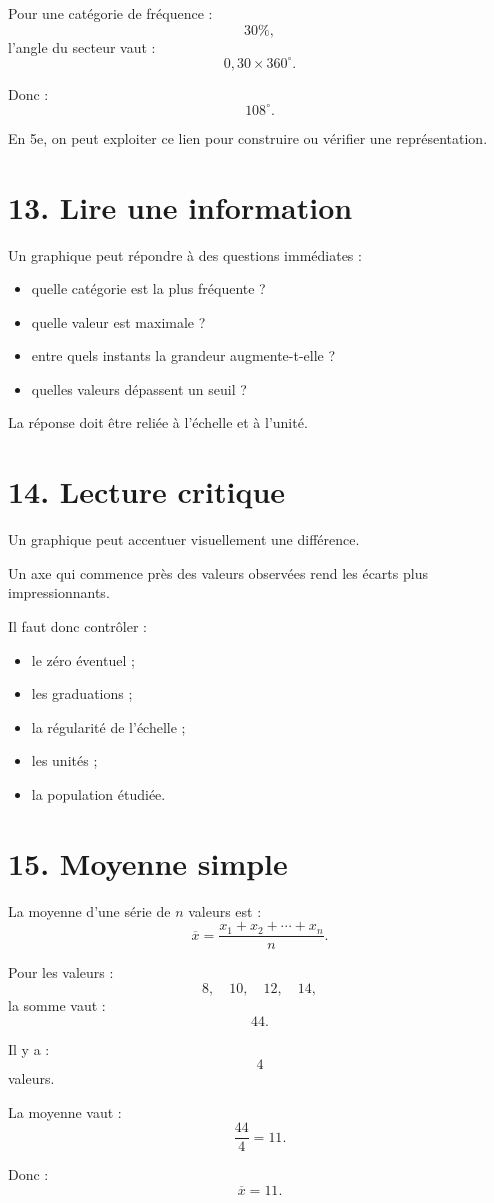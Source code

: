Pour une catégorie de fréquence :
\[
30\%,
\]
l'angle du secteur vaut :
\[
0{,}30\times360^\circ.
\]

Donc :
\[
108^\circ.
\]

En 5e, on peut exploiter ce lien pour construire ou vérifier une représentation.

\section{13. Lire une information}

Un graphique peut répondre à des questions immédiates :
\begin{itemize}
\item quelle catégorie est la plus fréquente ?
\item quelle valeur est maximale ?
\item entre quels instants la grandeur augmente-t-elle ?
\item quelles valeurs dépassent un seuil ?
\end{itemize}

La réponse doit être reliée à l'échelle et à l'unité.

\section{14. Lecture critique}

Un graphique peut accentuer visuellement une différence.

Un axe qui commence près des valeurs observées rend les écarts plus impressionnants.

Il faut donc contrôler :
\begin{itemize}
\item le zéro éventuel ;
\item les graduations ;
\item la régularité de l'échelle ;
\item les unités ;
\item la population étudiée.
\end{itemize}

\section{15. Moyenne simple}

La moyenne d'une série de $n$ valeurs est :
\[
\boxed{
\overline{x}
=
\dfrac{x_1+x_2+\cdots+x_n}{n}
}.
\]

\begin{exemple}
Pour les valeurs :
\[
8,\quad10,\quad12,\quad14,
\]
la somme vaut :
\[
44.
\]

Il y a :
\[
4
\]
valeurs.

La moyenne vaut :
\[
\dfrac{44}{4}=11.
\]

Donc :
\[
\boxed{\overline{x}=11}.
\]
\end{exemple}

